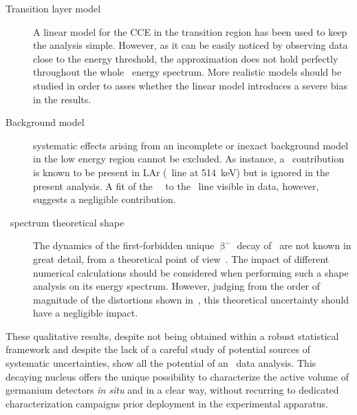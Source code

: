 \begin{description}
  \item[Transition layer model] A linear model for the CCE in the transition region has
    been used to keep the analysis simple. However, as it can be easily noticed by
    observing data close to the energy threshold, the approximation does not hold
    perfectly throughout the whole \Arl\ energy spectrum. More realistic models should be
    studied in order to asses whether the linear model introduces a severe bias in the
    results.
  \item[Background model] systematic effects arising from an incomplete or inexact
    background model in the low energy region cannot be excluded. As instance, a \Kr\
    contribution is known to be present in LAr (\g\ line at 514~keV) but is ignored in the
    present analysis. A fit of the \Kr\ \pdf\ to the \g\ line visible in data, however,
    suggests a negligible contribution.
  \item[\Arl\ spectrum theoretical shape] The dynamics of the first-forbidden unique
    $\upbeta^-$ decay of \Arl\ are not known in great detail, from a theoretical point of
    view~\cite{Kostensalo2017}. The impact of different numerical calculations should be
    considered when performing such a shape analysis on its energy spectrum. However,
    judging from the order of magnitude of the distortions shown in~\cite{Kostensalo2017},
    this theoretical uncertainty should have a negligible impact.
\end{description}

These qualitative results, despite not being obtained within a robust statistical
framework and despite the lack of a careful study of potential sources of systematic
uncertainties, show all the potential of an \Arl\ data analysis. This decaying nucleus
offers the unique possibility to characterize the active volume of germanium detectors
\emph{in situ} and in a clear way, without recurring to dedicated characterization
campaigns prior deployment in the experimental apparatus.

